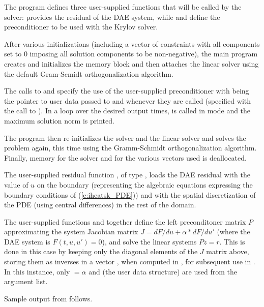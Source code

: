 The program defines three user-supplied functions that will be called by the
{\ida} solver:  provides the residual of the DAE system, while
 and  define the preconditioner to be used
with the Krylov solver.

After various initializations (including a vector of constraints with all components
set to $0$ imposing all solution components to be non-negative), the main program
creates and initializes the {\ida} memory block and then attaches the {\idaspgmr} linear
solver using the default  Gram-Scmidt orthogonalization algorithm. 

The calls to  and  specify
the use of the user-supplied preconditioner with  being the pointer to user data
passed to  and  whenever they are called (specified 
with the call to ).
In a loop over the desired output times,  is called in 
mode and the maximum solution norm is printed.

The  program then re-initializes the {\ida} solver and the {\idaspgmr} linear 
solver and solves the problem again, this time using the  Gramm-Schmidt
orthogonalization algorithm.
Finally, memory for the {\ida} solver and for the various vectors used is deallocated.

The user-supplied residual function , of type , loads the DAE
residual with the value of $u$ on the boundary (representing the algebraic equations
expressing the boundary conditions of (\ref{e:iheatsk_PDE})) and with the 
spatial discretization of the PDE (using central differences) in the rest of the domain.

The user-supplied functions  and  together define the 
left preconditoner matrix $P$ approximating the system Jacobian matrix               
$J = dF/du + \alpha*dF/du'$ (where the DAE system is $F(t,u,u') = 0$), and solve the linear   
systems $P z = r$.   This is done in this case by keeping only the diagonal elements of 
the $J$ matrix above, storing them as inverses in a vector , when computed in 
, for subsequent use in .                                 
In this instance, only  $=\alpha$ and  (the user data structure) are 
used from the  argument list.      

Sample output from  follows.
\vspace{0.1in}
